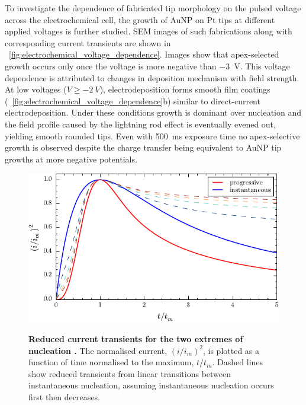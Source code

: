 \documentclass{article}
\begin{document}
To investigate the dependence of fabricated tip morphology on the pulsed voltage across the electrochemical cell, the growth of AuNP on Pt tips at different applied voltages is further studied. SEM images of such fabrications along with corresponding current transients are shown in \figurename~\ref{fig:electrochemical_voltage_dependence}. Images show that apex-selected growth occurs only once the voltage is more negative than \SI{-3}{V}. This voltage dependence is attributed to changes in deposition mechanism with field strength.
At low voltages ($V \geq \SI{-2}{V}$), electrodeposition forms smooth film coatings (\figurename~\ref{fig:electrochemical_voltage_dependence}b) similar to direct-current electrodeposition. Under these conditions growth is dominant over nucleation and the field profile caused by the lightning rod effect is eventually evened out, yielding smooth rounded tips. Even with \SI{500}{ms} exposure time no apex-selective growth is observed despite the charge transfer being equivalent to AuNP tip growths at more negative potentials.

\begin{figure}[bt]
\centering
{\includegraphics{figures/nucleation_theory}}
{\caption[Reduced current transients for the two extremes of nucleation \cite{scharifker1983}.]{\textbf{Reduced current transients for the two extremes of nucleation \cite{scharifker1983}.} The normalised current, $(i/i_m)^2$, is plotted as a function of time normalised to the maximum, $t/t_m$. Dashed lines show reduced transients from linear transitions between instantaneous nucleation, assuming instantaneous nucleation occurs first then decreases.}
\label{fig:nucleation_theory}}
\vspace{-5pt}
\end{figure}
\end{document}
